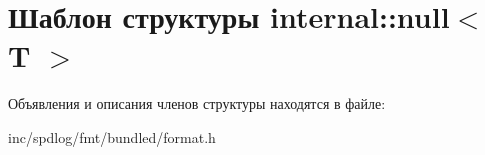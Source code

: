 \hypertarget{structinternal_1_1null}{}\section{Шаблон структуры internal\+:\+:null$<$ T $>$}
\label{structinternal_1_1null}


Объявления и описания членов структуры находятся в файле\+:\begin{DoxyCompactItemize}
\item 
inc/spdlog/fmt/bundled/format.\+h\end{DoxyCompactItemize}
